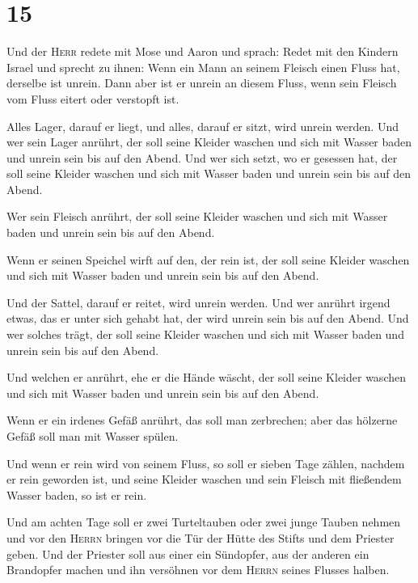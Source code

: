 \hypertarget{section-14}{%
\section{15}\label{section-14}}

 Und der \textsc{Herr} redete mit Mose und Aaron und
sprach:  Redet mit den Kindern Israel und sprecht zu
ihnen: Wenn ein Mann an seinem Fleisch einen Fluss hat, derselbe ist
unrein.  Dann aber ist er unrein an diesem Fluss, wenn
sein Fleisch vom Fluss eitert oder verstopft ist.

 Alles Lager, darauf er liegt, und alles, darauf er sitzt,
wird unrein werden.  Und wer sein Lager anrührt, der soll
seine Kleider waschen und sich mit Wasser baden und unrein sein bis auf
den Abend.  Und wer sich setzt, wo er gesessen hat, der
soll seine Kleider waschen und sich mit Wasser baden und unrein sein bis
auf den Abend.

 Wer sein Fleisch anrührt, der soll seine Kleider waschen
und sich mit Wasser baden und unrein sein bis auf den Abend.

 Wenn er seinen Speichel wirft auf den, der rein ist, der
soll seine Kleider waschen und sich mit Wasser baden und unrein sein bis
auf den Abend.

 Und der Sattel, darauf er reitet, wird unrein werden.
 Und wer anrührt irgend etwas, das er unter sich gehabt
hat, der wird unrein sein bis auf den Abend. Und wer solches trägt, der
soll seine Kleider waschen und sich mit Wasser baden und unrein sein bis
auf den Abend.

 Und welchen er anrührt, ehe er die Hände wäscht, der
soll seine Kleider waschen und sich mit Wasser baden und unrein sein bis
auf den Abend.

 Wenn er ein irdenes Gefäß anrührt, das soll man
zerbrechen; aber das hölzerne Gefäß soll man mit Wasser spülen.

 Und wenn er rein wird von seinem Fluss, so soll er
sieben Tage zählen, nachdem er rein geworden ist, und seine Kleider
waschen und sein Fleisch mit fließendem Wasser baden, so ist er rein.

 Und am achten Tage soll er zwei Turteltauben oder zwei
junge Tauben nehmen und vor den \textsc{Herrn} bringen vor die Tür der
Hütte des Stifts und dem Priester geben.  Und der
Priester soll aus einer ein Sündopfer, aus der anderen ein Brandopfer
machen und ihn versöhnen vor dem \textsc{Herrn} seines Flusses halben.

